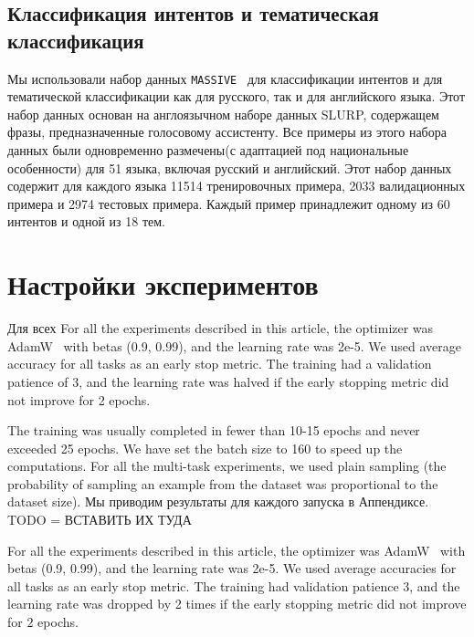 \begin{itemize}
\subsection{Классификация интентов и тематическая классификация }
Мы использовали набор данных \texttt{MASSIVE}~\cite{massive} для классификации интентов и для тематической классификации как для русского, так и для английского языка. Этот набор данных основан на англоязычном наборе данных SLURP\cite{clurp}, содержащем фразы, предназначенные голосовому ассистенту. 
 Все примеры из этого набора данных были одновременно размечены(с адаптацией под национальные особенности) для 51 языка, включая русский и английский. Этот набор данных содержит для каждого языка 11514 тренировочных примера, 2033 валидационных примера и 2974 тестовых примера. Каждый пример принадлежит одному из 60 интентов и одной из 18 тем. 


\section {Настройки экспериментов}

Для всех 
For all the experiments described in this article, the optimizer was AdamW~\cite{adam} with betas (0.9, 0.99), and the learning rate was 2e-5.%
We used average accuracy for all tasks as an early stop metric. The training had a validation patience of 3, and the learning rate was halved if the early stopping metric did not improve for 2 epochs. 

The training was usually completed in fewer than 10-15 epochs and never exceeded 25 epochs.%
We have set the batch size to 160 to speed up the computations. For all the multi-task experiments, we used plain sampling (the probability of sampling an example from the dataset was proportional to the dataset size). 
Мы приводим результаты для каждого запуска в Аппендиксе. TODO = ВСТАВИТЬ ИХ ТУДА


For all the experiments described in this article, the optimizer was AdamW~\cite{adam} with betas (0.9, 0.99), and the learning rate was 2e-5. 
We used average accuracies for all tasks as an early stop metric. The training had validation patience 3, and the learning rate was dropped by 2 times if the early stopping metric did not improve for 2 epochs. 


\end{itemize}
